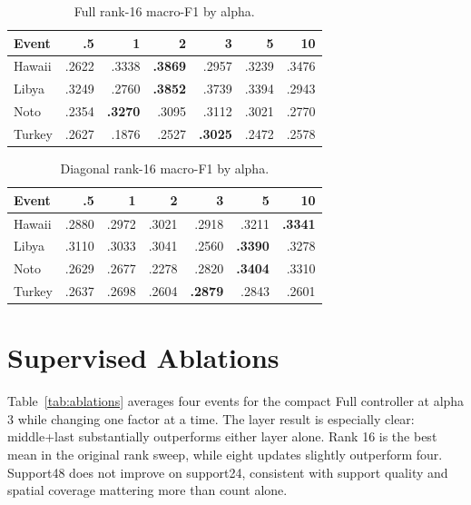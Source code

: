 \documentclass[conference]{IEEEtran}
\begin{document}
\begin{table}[t]
\centering\scriptsize
\caption{Full rank-16 macro-F1 by alpha.}
\label{tab:fullalpha}
\begin{tabular}{lrrrrrr}
\toprule
Event & .5 & 1 & 2 & 3 & 5 & 10\\
\midrule
Hawaii & .2622 & .3338 & \textbf{.3869} & .2957 & .3239 & .3476\\
Libya & .3249 & .2760 & \textbf{.3852} & .3739 & .3394 & .2943\\
Noto & .2354 & \textbf{.3270} & .3095 & .3112 & .3021 & .2770\\
Turkey & .2627 & .1876 & .2527 & \textbf{.3025} & .2472 & .2578\\
\bottomrule
\end{tabular}
\end{table}

\begin{table}[t]
\centering\scriptsize
\caption{Diagonal rank-16 macro-F1 by alpha.}
\label{tab:diagalpha}
\begin{tabular}{lrrrrrr}
\toprule
Event & .5 & 1 & 2 & 3 & 5 & 10\\
\midrule
Hawaii & .2880 & .2972 & .3021 & .2918 & .3211 & \textbf{.3341}\\
Libya & .3110 & .3033 & .3041 & .2560 & \textbf{.3390} & .3278\\
Noto & .2629 & .2677 & .2278 & .2820 & \textbf{.3404} & .3310\\
Turkey & .2637 & .2698 & .2604 & \textbf{.2879} & .2843 & .2601\\
\bottomrule
\end{tabular}
\end{table}

\section{Supervised Ablations}
Table~\ref{tab:ablations} averages four events for the compact Full controller
at alpha 3 while changing one factor at a time. The layer result is especially
clear: middle+last substantially outperforms either layer alone. Rank 16 is the
best mean in the original rank sweep, while eight updates slightly outperform
four. Support48 does not improve on support24, consistent with support quality
and spatial coverage mattering more than count alone.
\end{document}
